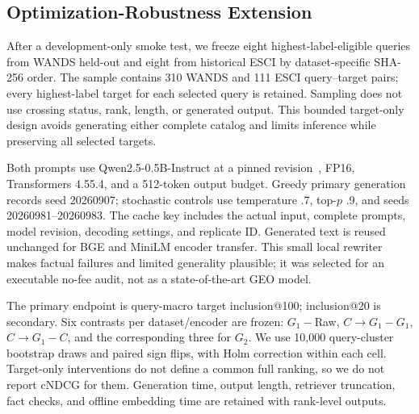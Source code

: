 \subsection{Optimization-Robustness Extension}
After a development-only smoke test, we freeze eight highest-label-eligible queries from WANDS held-out and eight from historical ESCI by dataset-specific SHA-256 order. The sample contains 310 WANDS and 111 ESCI query--target pairs; every highest-label target for each selected query is retained. Sampling does not use crossing status, rank, length, or generated output. This bounded target-only design avoids generating either complete catalog and limits inference while preserving all selected targets.

Both prompts use Qwen2.5-0.5B-Instruct at a pinned revision~\cite{qwen2024}, FP16, Transformers 4.55.4, and a 512-token output budget. Greedy primary generation records seed 20260907; stochastic controls use temperature .7, top-$p$ .9, and seeds 20260981--20260983. The cache key includes the actual input, complete prompts, model revision, decoding settings, and replicate ID. Generated text is reused unchanged for BGE and MiniLM encoder transfer. This small local rewriter makes factual failures and limited generality plausible; it was selected for an executable no-fee audit, not as a state-of-the-art GEO model.

The primary endpoint is query-macro target inclusion@100; inclusion@20 is secondary. Six contrasts per dataset/encoder are frozen: $G_1-$Raw, $C\!\to\!G_1-G_1$, $C\!\to\!G_1-C$, and the corresponding three for $G_2$. We use 10,000 query-cluster bootstrap draws and paired sign flips, with Holm correction within each cell. Target-only interventions do not define a common full ranking, so we do not report cNDCG for them. Generation time, output length, retriever truncation, fact checks, and offline embedding time are retained with rank-level outputs.
